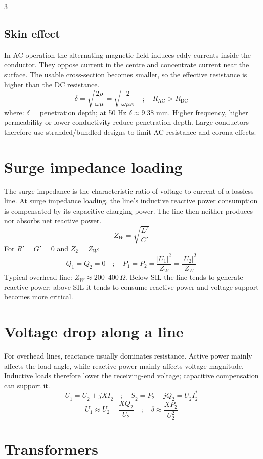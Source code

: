 \documentclass[9pt, landscape, a4paper]{article}
\begin{document}
\begin{multicols*}{3}
\subsection{Skin effect}
In AC operation the alternating magnetic field induces eddy currents inside the
conductor. They oppose current in the centre and concentrate current near the
surface. The usable cross-section becomes smaller, so the effective resistance
is higher than the DC resistance.
\[
  \delta=\sqrt{\frac{2\rho}{\omega\mu}}
  =\sqrt{\frac{2}{\omega\mu\kappa}}
  \quad ; \quad
  R_{\mathrm{AC}}>R_{\mathrm{DC}}
\]
where: $\delta$ = penetration depth; at 50 Hz $\delta\approx9.38$ mm.
Higher frequency, higher permeability or lower conductivity reduce
penetration depth. Large conductors therefore use stranded/bundled designs to
limit AC resistance and corona effects.

\section{Surge impedance loading}
The surge impedance is the characteristic ratio of voltage to current of a
lossless line. At surge impedance loading, the line's inductive reactive power
consumption is compensated by its capacitive charging power. The line then
neither produces nor absorbs net reactive power.
\[
  Z_W=\sqrt{\frac{L'}{C'}}
\]
For $R'=G'=0$ and $Z_2=Z_W$:
\[
  Q_1=Q_2=0
  \quad ; \quad
  P_1=P_2=\frac{|U_1|^2}{Z_W}=\frac{|U_2|^2}{Z_W}
\]
Typical overhead line: $Z_W\approx200$--$400\,\Omega$.
Below SIL the line tends to generate reactive power; above SIL it tends to
consume reactive power and voltage support becomes more critical.

\section{Voltage drop along a line}
For overhead lines, reactance usually dominates resistance. Active power mainly
affects the load angle, while reactive power mainly affects voltage magnitude.
Inductive loads therefore lower the receiving-end voltage; capacitive
compensation can support it.
\[
  \underline U_1=\underline U_2+jX\underline I_2
  \quad ; \quad
  \underline S_2=P_2+jQ_2=\underline U_2\underline I_2^*
\]
\[
  U_1\approx U_2+\frac{XQ_2}{U_2}
  \quad ; \quad
  \delta\approx\frac{XP_2}{U_2^2}
\]

\section{Transformers}

\end{multicols*}
\end{document}
